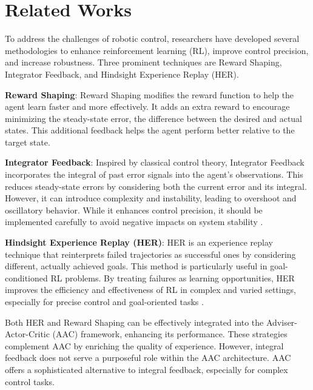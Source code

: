 \section{Related Works}
To address the challenges of robotic control, researchers have developed several methodologies to enhance reinforcement learning (RL), improve control precision, and increase robustness. Three prominent techniques are Reward Shaping, Integrator Feedback, and Hindsight Experience Replay (HER).

\textbf{Reward Shaping}:
Reward Shaping modifies the reward function to help the agent learn faster and more effectively. It adds an extra reward to encourage minimizing the steady-state error, the difference between the desired and actual states. This additional feedback helps the agent perform better relative to the target state\cite{burda_exploration_2018,hu_learning_2020}.

\textbf{Integrator Feedback}:
Inspired by classical control theory, Integrator Feedback incorporates the integral of past error signals into the agent's observations. This reduces steady-state errors by considering both the current error and its integral.  However, it can introduce complexity and instability, leading to overshoot and oscillatory behavior. While it enhances control precision, it should be implemented carefully to avoid negative impacts on system stability \cite{tracey_towards_2023}.

\textbf{Hindsight Experience Replay (HER)}:
HER is an experience replay technique that reinterprets failed trajectories as successful ones by considering different, actually achieved goals. This method is particularly useful in goal-conditioned RL problems. By treating failures as learning opportunities, HER improves the efficiency and effectiveness of RL in complex and varied settings, especially for precise control and goal-oriented tasks \cite{andrychowicz_hindsight_2018,moro_goal-directed_2022}.

Both HER and Reward Shaping can be effectively integrated into the Adviser-Actor-Critic (AAC) framework, enhancing its performance. These strategies complement AAC by enriching the quality of experience. However, integral feedback does not serve a purposeful role within the AAC architecture. AAC offers a sophisticated alternative to integral feedback, especially for complex control tasks.